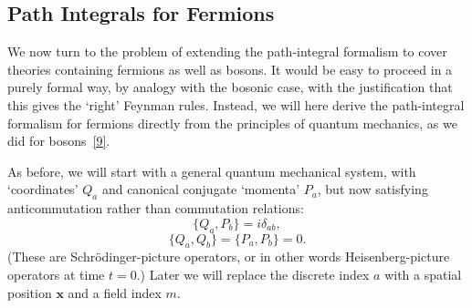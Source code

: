 
\subsection{Path Integrals for Fermions}

We now turn to the problem of extending the path-integral formalism to cover
theories containing fermions as well as bosons. It would be easy to proceed in
a purely formal way, by analogy with the bosonic case, with the justification
that this gives the `right' Feynman rules. Instead, we will here derive the
path-integral formalism for fermions directly from the principles of quantum
mechanics, as we did for bosons~\hyperref[ref:9.9]{[9]}.

As before, we will start with a general quantum mechanical system, with
`coordinates' $Q_a$ and canonical conjugate `momenta' $P_a$, but now satisfying
anticommutation rather than commutation relations:
\begin{equation}
\{Q_a,P_b\}=i\delta_{ab},
\tag{9.5.1}\label{eq:9.5.1}
\end{equation}
\begin{equation}
\{Q_a,Q_b\}=\{P_a,P_b\}=0.
\tag{9.5.2}\label{eq:9.5.2}
\end{equation}
(These are Schrödinger-picture operators, or in other words
Heisenberg-picture operators at time $t=0$.) Later we will replace the discrete
index $a$ with a spatial position $\mathbf{x}$ and a field index $m$.

